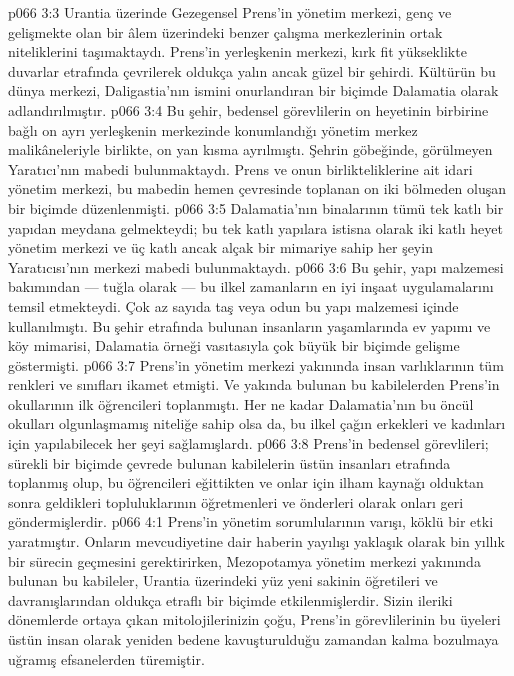 \vs p066 3:3 Urantia üzerinde Gezegensel Prens’in yönetim merkezi, genç ve gelişmekte olan bir âlem üzerindeki benzer çalışma merkezlerinin ortak niteliklerini taşımaktaydı. Prens’in yerleşkenin merkezi, kırk fit yükseklikte duvarlar etrafında çevrilerek oldukça yalın ancak güzel bir şehirdi. Kültürün bu dünya merkezi, Daligastia’nın ismini onurlandıran bir biçimde Dalamatia olarak adlandırılmıştır.
\vs p066 3:4 Bu şehir, bedensel görevlilerin on heyetinin birbirine bağlı on ayrı yerleşkenin merkezinde konumlandığı yönetim merkez malikâneleriyle birlikte, on yan kısma ayrılmıştı. Şehrin göbeğinde, görülmeyen Yaratıcı’nın mabedi bulunmaktaydı. Prens ve onun birlikteliklerine ait idari yönetim merkezi, bu mabedin hemen çevresinde toplanan on iki bölmeden oluşan bir biçimde düzenlenmişti.
\vs p066 3:5 Dalamatia’nın binalarının tümü tek katlı bir yapıdan meydana gelmekteydi; bu tek katlı yapılara istisna olarak iki katlı heyet yönetim merkezi ve üç katlı ancak alçak bir mimariye sahip her şeyin Yaratıcısı’nın merkezi mabedi bulunmaktaydı.
\vs p066 3:6 Bu şehir, yapı malzemesi bakımından --- tuğla olarak --- bu ilkel zamanların en iyi inşaat uygulamalarını temsil etmekteydi. Çok az sayıda taş veya odun bu yapı malzemesi içinde kullanılmıştı. Bu şehir etrafında bulunan insanların yaşamlarında ev yapımı ve köy mimarisi, Dalamatia örneği vasıtasıyla çok büyük bir biçimde gelişme göstermişti.
\vs p066 3:7 Prens’in yönetim merkezi yakınında insan varlıklarının tüm renkleri ve sınıfları ikamet etmişti. Ve yakında bulunan bu kabilelerden Prens’in okullarının ilk öğrencileri toplanmıştı. Her ne kadar Dalamatia’nın bu öncül okulları olgunlaşmamış niteliğe sahip olsa da, bu ilkel çağın erkekleri ve kadınları için yapılabilecek her şeyi sağlamışlardı.
\vs p066 3:8 Prens’in bedensel görevlileri; sürekli bir biçimde çevrede bulunan kabilelerin üstün insanları etrafında toplanmış olup, bu öğrencileri eğittikten ve onlar için ilham kaynağı olduktan sonra geldikleri topluluklarının öğretmenleri ve önderleri olarak onları geri göndermişlerdir.
\vs p066 4:1 Prens’in yönetim sorumlularının varışı, köklü bir etki yaratmıştır. Onların mevcudiyetine dair haberin yayılışı yaklaşık olarak bin yıllık bir sürecin geçmesini gerektirirken, Mezopotamya yönetim merkezi yakınında bulunan bu kabileler, Urantia üzerindeki yüz yeni sakinin öğretileri ve davranışlarından oldukça etraflı bir biçimde etkilenmişlerdir. Sizin ileriki dönemlerde ortaya çıkan mitolojilerinizin çoğu, Prens’in görevlilerinin bu üyeleri üstün insan olarak yeniden bedene kavuşturulduğu zamandan kalma bozulmaya uğramış efsanelerden türemiştir.
